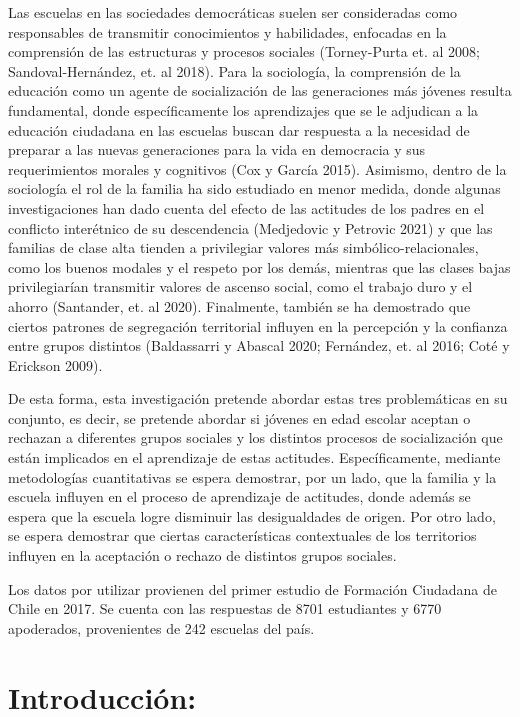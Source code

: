 \documentclass[12pt,twoside]{templates/facsothesis}
\begin{document}
Las escuelas en las sociedades democráticas suelen ser consideradas como responsables de transmitir conocimientos y habilidades, enfocadas en la comprensión de las estructuras y procesos sociales (Torney-Purta et. al 2008; Sandoval-Hernández, et. al 2018). Para la sociología, la comprensión de la educación como un agente de socialización de las generaciones más jóvenes resulta fundamental, donde específicamente los aprendizajes que se le adjudican a la educación ciudadana en las escuelas buscan dar respuesta a la necesidad de preparar a las nuevas generaciones para la vida en democracia y sus requerimientos morales y cognitivos (Cox y García 2015). Asimismo, dentro de la sociología el rol de la familia ha sido estudiado en menor medida, donde algunas investigaciones han dado cuenta del efecto de las actitudes de los padres en el conflicto interétnico de su descendencia (Medjedovic y Petrovic 2021) y que las familias de clase alta tienden a privilegiar valores más simbólico-relacionales, como los buenos modales y el respeto por los demás, mientras que las clases bajas privilegiarían transmitir valores de ascenso social, como el trabajo duro y el ahorro (Santander, et. al 2020). Finalmente, también se ha demostrado que ciertos patrones de segregación territorial influyen en la percepción y la confianza entre grupos distintos (Baldassarri y Abascal 2020; Fernández, et. al 2016; Coté y Erickson 2009).

De esta forma, esta investigación pretende abordar estas tres problemáticas en su conjunto, es decir, se pretende abordar si jóvenes en edad escolar aceptan o rechazan a diferentes grupos sociales y los distintos procesos de socialización que están implicados en el aprendizaje de estas actitudes. Específicamente, mediante metodologías cuantitativas se espera demostrar, por un lado, que la familia y la escuela influyen en el proceso de aprendizaje de actitudes, donde además se espera que la escuela logre disminuir las desigualdades de origen. Por otro lado, se espera demostrar que ciertas características contextuales de los territorios influyen en la aceptación o rechazo de distintos grupos sociales.

Los datos por utilizar provienen del primer estudio de Formación Ciudadana de Chile en 2017. Se cuenta con las respuestas de 8701 estudiantes y 6770 apoderados, provenientes de 242 escuelas del país.

\hypertarget{introducciuxf3n}{%
\chapter{Introducción:}\label{introducciuxf3n}}
\end{document}

